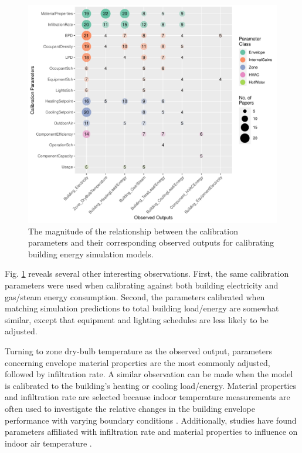\documentclass[review]{elsarticle}
\begin{document}
\begin{figure}[!h]
\centering
\includegraphics[width=\textwidth]{figures/output_parameter.pdf}
\caption{The magnitude of the relationship between the calibration parameters and their corresponding observed outputs for calibrating building energy simulation models.}
\label{fig:target_param}
\end{figure}

Fig. \ref{fig:target_param} reveals several other interesting observations. First, the same calibration parameters were used when calibrating against both building electricity and gas/steam energy consumption. Second, the parameters calibrated when matching simulation predictions to total building load/energy are somewhat similar, except that equipment and lighting schedules are less likely to be adjusted. 

Turning to zone dry-bulb temperature as the observed output, parameters concerning envelope material properties are the most commonly adjusted, followed by infiltration rate. A similar observation can be made when the model is calibrated to the building's heating or cooling load/energy. Material properties and infiltration rate are selected because indoor temperature measurements are often used to investigate the relative changes in the building envelope performance with varying boundary conditions \cite{lee2018improvements, figueiredo2018comparison, cacabelos2017development, enriquez2017towards}. Additionally, studies have found parameters affiliated with infiltration rate and material properties to influence on indoor air temperature \cite{martinez2019energy, enriquez2017towards, roberti2015calibrating, cipriano2015evaluation, ferrara2020optimizing}. 
\end{document}
